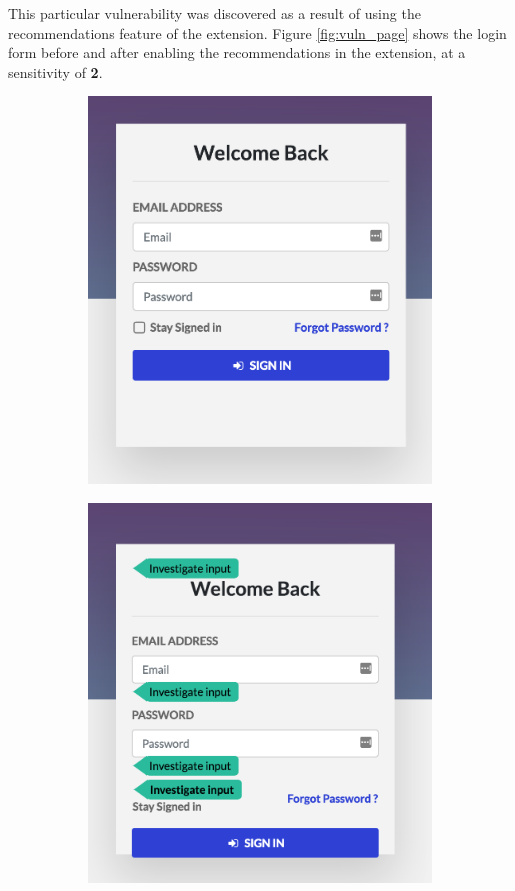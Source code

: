 This particular vulnerability was discovered as a result of using the recommendations feature of the extension. Figure \ref{fig:vuln_page} shows the login form before and after enabling the recommendations in the extension, at a sensitivity of \textbf{2}.

\begin{figure}[h]
	\centering
	\begin{subfigure}{.5\textwidth}
		\centering
		\includegraphics[width=.8\linewidth]{images/test_case_1/original_page_anon_cropped.png}
		\label{fig:original_page_anon}
	\end{subfigure}%
	\begin{subfigure}{.5\textwidth}
		\centering
		\includegraphics[width=.8\linewidth]{images/test_case_1/recommendations_anon_cropped.png}

\end{subfigure}
\end{figure}
